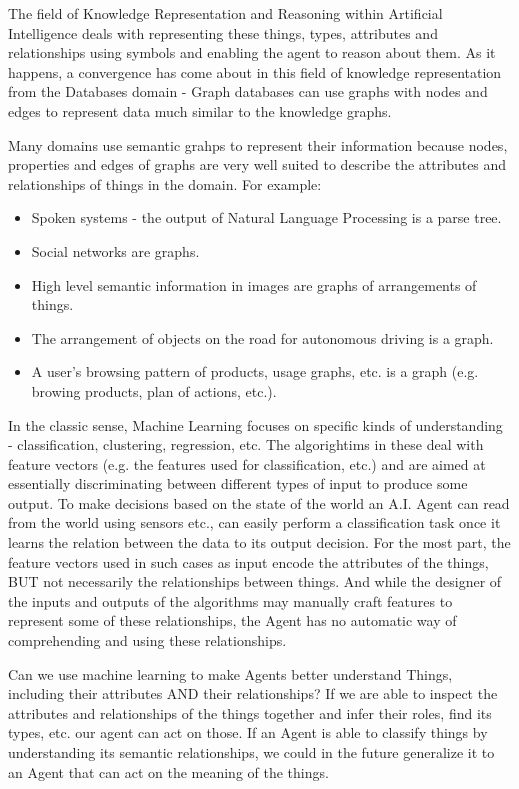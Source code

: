 \documentclass[runningheads,a4paper]{llncs}
\begin{document}
The field of Knowledge Representation and Reasoning within Artificial Intelligence
deals with representing these things, types, attributes and relationships
using symbols and enabling the agent to reason about them. As it happens, a
convergence has come about in this field of knowledge representation from the
Databases domain - Graph databases can use graphs with nodes and edges to
represent data much similar to the knowledge graphs.

Many domains use semantic grahps to represent their information because nodes,
properties and edges of graphs are very well suited to describe the attributes
and relationships of things in the domain. For example:
\begin{itemize}
\item Spoken systems - the output of Natural Language Processing is a parse
tree.
\item Social networks are graphs.
\item High level semantic information in images are graphs of arrangements of
things.
\item The arrangement of objects on the road for autonomous driving is a graph.
\item A user’s browsing pattern of products, usage graphs, etc. is a graph (e.g. browing products, plan of actions, etc.).
\end{itemize}

In the classic sense, Machine Learning focuses on specific kinds of understanding
- classification, clustering, regression, etc. The algorightims in these deal with
feature vectors (e.g. the features used for classification, etc.) and are aimed
at essentially discriminating between different types of input to produce some
output. To make decisions based on the state of the world an A.I. Agent can
read from the world using sensors etc., can easily perform a classification task
once it learns the relation between the data to its output decision. For the most
part, the feature vectors used in such cases as input encode the attributes of
the things, BUT not necessarily the relationships between things. And while
the designer of the inputs and outputs of the algorithms may manually craft
features to represent some of these relationships, the Agent has no automatic
way of comprehending and using these relationships.

Can we use machine learning to make Agents better understand Things, including
their attributes AND their relationships? If we are able to inspect the attributes
and relationships of the things together and infer their roles, find its types, etc.
our agent can act on those. If an Agent is able to classify things by understanding
its semantic relationships, we could in the future generalize it to an Agent that
can act on the meaning of the things.
\end{document}
